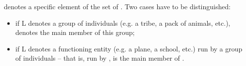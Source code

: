  denotes a specific element of the set of . Two cases have to be distinguished:

\begin{itemize}

\item if L denotes a group of individuals (e.g. a tribe, a pack of animals, etc.),  denotes the main member of this group;

\item if L denotes a functioning entity (e.g. a plane, a school, etc.) run by a group of individuals -- that is, run by ,  is the main member of .

\end{itemize}

